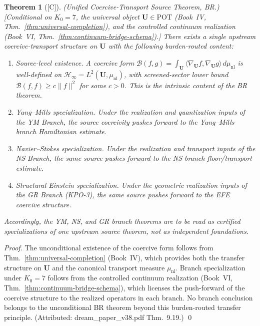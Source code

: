 \documentclass[12pt,oneside]{amsbook}
\theoremstyle{plain}
\newtheorem{theorem}{Theorem}[section]
\theoremstyle{definition}
\theoremstyle{remark}
\newcommand{\status}[1]{\textup{[#1]}}
\begin{document}
\begin{theorem}[\status{C}]\label{thm:BR-source}
\textup{(Unified Coercive-Transport Source Theorem, BR.)}
\textup{[Conditional on $K_0 = 7$, the universal object
$\mathbf{U} \in \mathrm{POT}$ (Book~IV, Thm.~\ref{thm:universal-completion}),
and the controlled continuum realization
(Book~VI, Thm.~\ref{thm:continuum-bridge-schema}).]}
There exists a single upstream coercive-transport structure on
$\mathbf{U}$ with the following burden-routed content:
\begin{enumerate}[label=\textup{(\roman*)}]
  \item \emph{Source-level existence.}  A coercive form
    $\mathcal{B}(f,g) = \int_{\mathbf{U}} \langle\nabla_{\mathbf{U}}
    f, \nabla_{\mathbf{U}} g\rangle\,d\mu_{\mathrm{nl}}$ is
    well-defined on $\mathcal{H}_\infty = L^2(\mathbf{U}, \mu_{\mathrm{nl}})$,
    with screened-sector lower bound
    $\mathcal{B}(f,f) \geq c\|f\|^2$ for some $c > 0$.
    This is the intrinsic content of the BR theorem.
  \item \emph{Yang--Mills specialization.}  Under the realization
    and quantization inputs of the YM Branch, the source coercivity
    pushes forward to the Yang--Mills branch Hamiltonian estimate.
  \item \emph{Navier--Stokes specialization.}  Under the realization
    and transport inputs of the NS Branch, the same source pushes
    forward to the NS branch floor/transport estimate.
  \item \emph{Structural Einstein specialization.}  Under the
    geometric realization inputs of the GR Branch (KPO-3), the same
    source pushes forward to the EFE coercive structure.
\end{enumerate}
Accordingly, the YM, NS, and GR branch theorems are to be read as
certified specializations of one upstream source theorem, not as
independent foundations.
\end{theorem}

\begin{proof}
The unconditional existence of the coercive form follows from
Thm.~\ref{thm:universal-completion} (Book~IV), which provides both
the transfer structure on $\mathbf{U}$ and the canonical transport
measure $\mu_{\mathrm{nl}}$.  Branch specialization under $K_0 = 7$
follows from the controlled continuum realization
(Book~VI, Thm.~\ref{thm:continuum-bridge-schema}), which licenses
the push-forward of the coercive structure to the realized operators
in each branch.  No branch conclusion belongs to the unconditional BR
theorem beyond this burden-routed transfer principle.
(Attributed: dream\_paper\_v38.pdf Thm.~9.19.) \qed
\end{proof}
\end{document}
